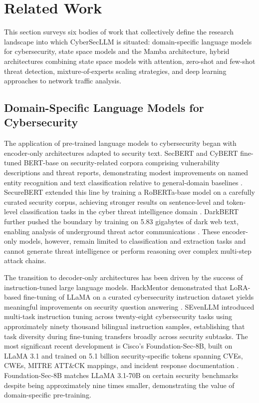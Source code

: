 \documentclass[journal]{IEEEtran}
\newcommand{\modelname}{CyberSecLLM}
\begin{document}
\section{Related Work}
\label{sec:related_work}

This section surveys six bodies of work that collectively define the research landscape into which \modelname{} is situated: domain-specific language models for cybersecurity, state space models and the Mamba architecture, hybrid architectures combining state space models with attention, zero-shot and few-shot threat detection, mixture-of-experts scaling strategies, and deep learning approaches to network traffic analysis.

\subsection{Domain-Specific Language Models for Cybersecurity}
\label{subsec:security_llms}

The application of pre-trained language models to cybersecurity began with encoder-only architectures adapted to security text. SecBERT and CyBERT fine-tuned BERT-base on security-related corpora comprising vulnerability descriptions and threat reports, demonstrating modest improvements on named entity recognition and text classification relative to general-domain baselines \cite{bayer2022cysecbert}. SecureBERT extended this line by training a RoBERTa-base model on a carefully curated security corpus, achieving stronger results on sentence-level and token-level classification tasks in the cyber threat intelligence domain \cite{aghaei2023securellm}. DarkBERT further pushed the boundary by training on 5.83 gigabytes of dark web text, enabling analysis of underground threat actor communications \cite{jin2023darkbert}. These encoder-only models, however, remain limited to classification and extraction tasks and cannot generate threat intelligence or perform reasoning over complex multi-step attack chains.

The transition to decoder-only architectures has been driven by the success of instruction-tuned large language models. HackMentor demonstrated that LoRA-based fine-tuning of LLaMA on a curated cybersecurity instruction dataset yields meaningful improvements on security question answering \cite{zhang2024hackmentor}. SEvenLLM introduced multi-task instruction tuning across twenty-eight cybersecurity tasks using approximately ninety thousand bilingual instruction samples, establishing that task diversity during fine-tuning transfers broadly across security subtasks. The most significant recent development is Cisco's Foundation-Sec-8B, built on LLaMA 3.1 and trained on 5.1 billion security-specific tokens spanning CVEs, CWEs, MITRE ATT\&CK mappings, and incident response documentation \cite{cisco2025foundationsec}. Foundation-Sec-8B matches LLaMA 3.1-70B on certain security benchmarks despite being approximately nine times smaller, demonstrating the value of domain-specific pre-training.
\end{document}

